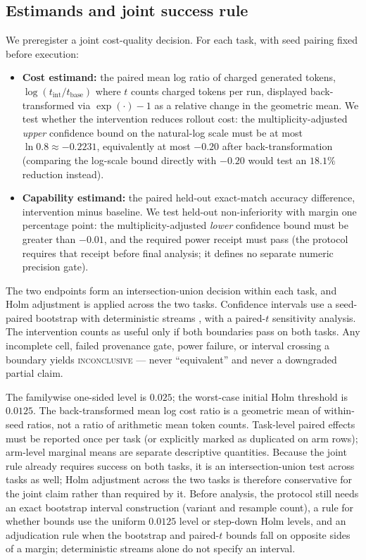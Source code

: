 \documentclass[11pt]{article}
\begin{document}
\subsection{Estimands and joint success rule}

We preregister a joint cost-quality decision. For each task, with seed pairing fixed before execution:
\begin{itemize}
  \item \textbf{Cost estimand:} the paired mean log ratio of charged generated tokens, $\log(t_{\mathrm{int}}/t_{\mathrm{base}})$ where $t$ counts charged tokens per run, displayed back-transformed via $\exp(\cdot)-1$ as a relative change in the geometric mean. We test whether the intervention reduces rollout cost: the multiplicity-adjusted \emph{upper} confidence bound on the natural-log scale must be at most $\ln 0.8\approx-0.2231$, equivalently at most $-0.20$ after back-transformation (comparing the log-scale bound directly with $-0.20$ would test an $18.1\%$ reduction instead).
  \item \textbf{Capability estimand:} the paired held-out exact-match accuracy difference, intervention minus baseline. We test held-out non-inferiority with margin one percentage point: the multiplicity-adjusted \emph{lower} confidence bound must be greater than $-0.01$, and the required power receipt must pass (the protocol requires that receipt before final analysis; it defines no separate numeric precision gate).
\end{itemize}

The two endpoints form an intersection-union decision within each task, and Holm adjustment \citep{holm1979simple} is applied across the two tasks. Confidence intervals use a seed-paired bootstrap with deterministic streams \citep{efron1993bootstrap}, with a paired-$t$ sensitivity analysis. The intervention counts as useful only if both boundaries pass on both tasks. Any incomplete cell, failed provenance gate, power failure, or interval crossing a boundary yields \textsc{inconclusive} --- never ``equivalent'' and never a downgraded partial claim.

The familywise one-sided level is $0.025$; the worst-case initial Holm
threshold is $0.0125$. The back-transformed mean log cost ratio is a geometric
mean of within-seed ratios, not a ratio of arithmetic mean token counts.
Task-level paired effects must be reported once per task (or explicitly
marked as duplicated on arm rows); arm-level marginal means are separate
descriptive quantities. Because the joint rule already requires success on
both tasks, it is an intersection-union test across tasks as well; Holm
adjustment across the two tasks is therefore conservative for the joint claim
rather than required by it. Before analysis, the protocol still needs an exact
bootstrap interval construction (variant and resample count), a rule for
whether bounds use the uniform $0.0125$ level or step-down Holm levels, and an
adjudication rule when the bootstrap and paired-$t$ bounds fall on opposite
sides of a margin; deterministic streams alone do not specify an interval.
\end{document}
